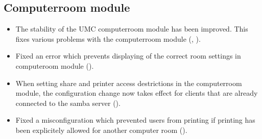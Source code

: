 \subsection{Computerroom module}
\begin{itemize}
\item The stability of the UMC computerroom module has been improved. This fixes various problems with the
      computerroom module (, ).
\item Fixed an error which prevents displaying of the correct room settings in computeroom module ().
\item When setting share and printer access destrictions in the computerroom module, the configuration change now takes effect for clients that are already connected to the samba server ().
\item Fixed a misconfiguration which prevented users from printing if printing has been explicitely allowed for another computer room ().
\end{itemize}


